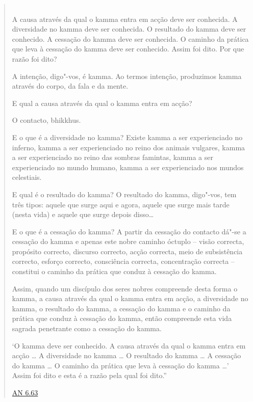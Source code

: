 \clearpage

\thispagestyle{empty}
\enlargethispage{-\baselineskip}

\begin{quote}

  \\
  A causa através da qual o kamma entra em acção
  deve ser conhecida. A diversidade no kamma deve ser conhecida. O resultado do
  kamma deve ser conhecido. A cessação do kamma deve ser conhecida. O caminho da
  prática que leva à cessação do kamma deve ser conhecido. Assim foi dito. Por
  que razão foi dito?

  A intenção, digo"-vos, é kamma. Ao termos intenção, produzimos kamma através do
  corpo, da fala e da mente.

  E qual a causa através da qual o kamma entra em acção?

  O contacto, bhikkhus.

  E o que é a diversidade no kamma? Existe kamma a ser experienciado no inferno,
  kamma a ser experienciado no reino dos animais vulgares, kamma a ser
  experienciado no reino das sombras famintas, kamma a ser experienciado no
  mundo humano, kamma a ser experienciado nos mundos celestiais.

  E qual é o resultado do kamma? O resultado do kamma, digo"-vos, tem três tipos:
  aquele que surge aqui e agora, aquele que surge mais tarde (nesta vida) e
  aquele que surge depois disso\ldots{}

  E o que é a cessação do kamma? A partir da cessação do contacto dá"-se a
  cessação do kamma e apenas este nobre caminho óctuplo -- visão correcta,
  propósito correcto, discurso correcto, acção correcta, meio de subsistência
  correcto, esforço correcto, consciência correcta, concentração correcta --
  constitui o caminho da prática que conduz à cessação do kamma.

  \thispagestyle{empty}

  Assim, quando um discípulo dos seres nobres compreende desta forma o kamma, a
  causa através da qual o kamma entra em acção, a diversidade no kamma, o
  resultado do kamma, a cessação do kamma e o caminho da prática que conduz à
  cessação do kamma, então compreende esta vida sagrada penetrante como a
  cessação do kamma.

  `O kamma deve ser conhecido. A causa através da qual o kamma entra em acção
  \ldots{} A diversidade no kamma \ldots{} O resultado do kamma \ldots{} A
  cessação do kamma \ldots{} O caminho da prática que leva à cessação do kamma
  \ldots{}' Assim foi dito e esta é a razão pela qual foi dito.”

  \href{https://suttacentral.net/an6.63/en/thanissaro}{AN 6.63}

\end{quote}
